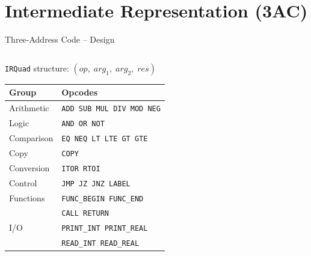 \documentclass[aspectratio=169,11pt]{beamer}
\begin{document}
\section{Intermediate Representation (3AC)}

\begin{frame}{Three-Address Code -- Design}
\begin{columns}[t]
  \begin{block}{\texttt{IRQuad} structure: $(op,\;arg_1,\;arg_2,\;res)$}
    \centering\small
    \begin{tabular}{ll}
      \toprule
      \textbf{Group} & \textbf{Opcodes} \\
      \midrule
      Arithmetic  & \texttt{ADD SUB MUL DIV MOD NEG} \\
      Logic       & \texttt{AND OR NOT} \\
      Comparison  & \texttt{EQ NEQ LT LTE GT GTE} \\
      Copy        & \texttt{COPY} \\
      Conversion  & \texttt{ITOR RTOI} \\
      Control     & \texttt{JMP JZ JNZ LABEL} \\
      Functions   & \texttt{FUNC\_BEGIN FUNC\_END} \\
                  & \texttt{CALL RETURN} \\
      I/O         & \texttt{PRINT\_INT PRINT\_REAL} \\
                  & \texttt{READ\_INT READ\_REAL} \\
      \bottomrule
    \end{tabular}
  \end{block}


\end{columns}
\end{frame}
\end{document}
